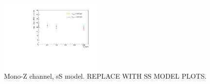 \begin{figure}
\begin{center}
\includegraphics[width=0.45\textwidth]{figures/monoZ_sigma_limits_variedDMmass.pdf}
\caption{Mono-Z channel, sS model. REPLACE WITH SS MODEL PLOTS.}
\label{fig:MonoZ_SSD_limit}
\end{center}
\end{figure}

